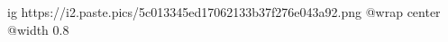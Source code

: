  
 
 
 
 

\ifcmt
  ig https://i2.paste.pics/5c013345ed17062133b37f276e043a92.png
	@wrap center
	@width 0.8
\fi

